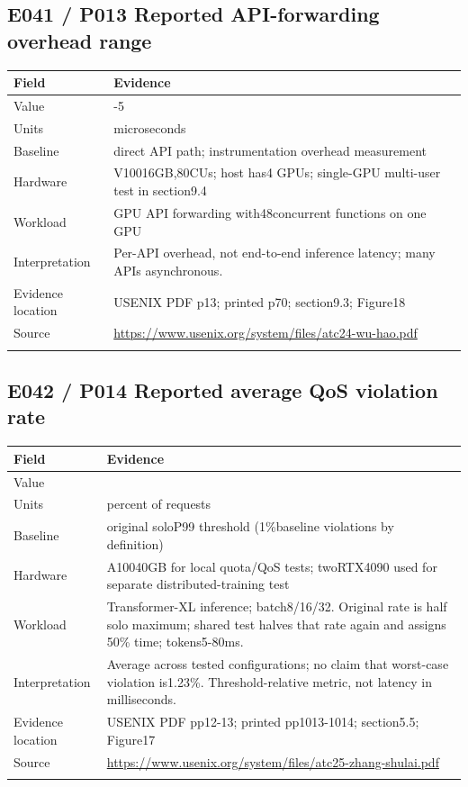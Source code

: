 \subsection*{E041 / P013 Reported API-forwarding overhead range}

\begin{longtable}{>{\raggedright\arraybackslash}p{}>{\raggedright\arraybackslash}p{}}
\toprule
\textbf{Field} & \textbf{Evidence}\\\midrule\endhead
Value & 3-5\\\addlinespace
Units & microseconds\\\addlinespace
Baseline & direct API path; instrumentation overhead measurement\\\addlinespace
Hardware & V10016GB,80CUs; host has4 GPUs; single-GPU multi-user test in section9.4\\\addlinespace
Workload & GPU API forwarding with48concurrent functions on one GPU\\\addlinespace
Interpretation & Per-API overhead, not end-to-end inference latency; many APIs asynchronous.\\\addlinespace
Evidence location & USENIX PDF p13; printed p70; section9.3; Figure18\\\addlinespace
Source & \url{https://www.usenix.org/system/files/atc24-wu-hao.pdf}\\\addlinespace
\bottomrule\end{longtable}

\subsection*{E042 / P014 Reported average QoS violation rate}

\begin{longtable}{>{\raggedright\arraybackslash}p{}>{\raggedright\arraybackslash}p{}}
\toprule
\textbf{Field} & \textbf{Evidence}\\\midrule\endhead
Value & 1.23\\\addlinespace
Units & percent of requests\\\addlinespace
Baseline & original soloP99 threshold (1\%baseline violations by definition)\\\addlinespace
Hardware & A10040GB for local quota/QoS tests; twoRTX4090 used for separate distributed-training test\\\addlinespace
Workload & Transformer-XL inference; batch8/16/32. Original rate is half solo maximum; shared test halves that rate again and assigns 50\% time; tokens5-80ms.\\\addlinespace
Interpretation & Average across tested configurations; no claim that worst-case violation is1.23\%. Threshold-relative metric, not latency in milliseconds.\\\addlinespace
Evidence location & USENIX PDF pp12-13; printed pp1013-1014; section5.5; Figure17\\\addlinespace
Source & \url{https://www.usenix.org/system/files/atc25-zhang-shulai.pdf}\\\addlinespace
\bottomrule\end{longtable}

